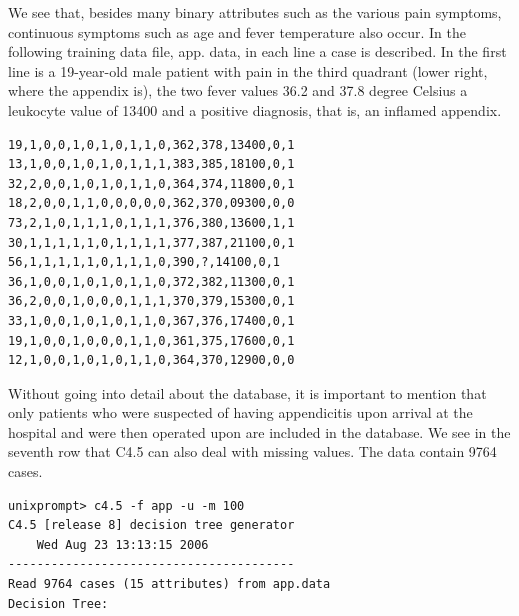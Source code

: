 \documentclass[10pt]{article}
\begin{document}
We see that, besides many binary attributes such as the various pain symptoms, continuous symptoms such as age and fever temperature also occur. In the following training data file, app. data, in each line a case is described. In the first line is a 19-year-old male patient with pain in the third quadrant (lower right, where the appendix is), the two fever values 36.2 and 37.8 degree Celsius a leukocyte value of 13400 and a positive diagnosis, that is, an inflamed appendix.

\begin{verbatim}
19,1,0,0,1,0,1,0,1,1,0,362,378,13400,0,1
13,1,0,0,1,0,1,0,1,1,1,383,385,18100,0,1
32,2,0,0,1,0,1,0,1,1,0,364,374,11800,0,1
18,2,0,0,1,1,0,0,0,0,0,362,370,09300,0,0
73,2,1,0,1,1,1,0,1,1,1,376,380,13600,1,1
30,1,1,1,1,1,0,1,1,1,1,377,387,21100,0,1
56,1,1,1,1,1,0,1,1,1,0,390,?,14100,0,1
36,1,0,0,1,0,1,0,1,1,0,372,382,11300,0,1
36,2,0,0,1,0,0,0,1,1,1,370,379,15300,0,1
33,1,0,0,1,0,1,0,1,1,0,367,376,17400,0,1
19,1,0,0,1,0,0,0,1,1,0,361,375,17600,0,1
12,1,0,0,1,0,1,0,1,1,0,364,370,12900,0,0
\end{verbatim}

Without going into detail about the database, it is important to mention that only patients who were suspected of having appendicitis upon arrival at the hospital and were then operated upon are included in the database. We see in the seventh row that C4.5 can also deal with missing values. The data contain 9764 cases.

\begin{verbatim}
unixprompt> c4.5 -f app -u -m 100
C4.5 [release 8] decision tree generator
    Wed Aug 23 13:13:15 2006
----------------------------------------
Read 9764 cases (15 attributes) from app.data
Decision Tree:
\end{verbatim}
\end{document}
